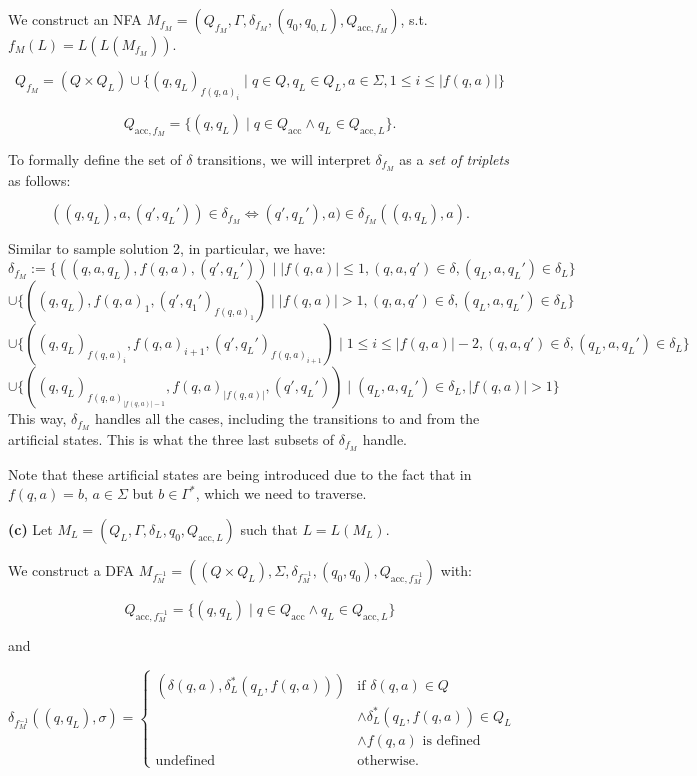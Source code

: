 We construct an NFA $M_{f_M} = (Q_{f_M}, \Gamma, \delta_{f_M}, (q_0, q_{0, L}), Q_{\text{acc},f_M})$, s.t. $f_M(L) = L(L(M_{f_M}))$.

\[
Q_{f_M} = (Q \times Q_L) \cup \{(q, q_L)_{f(q,a)_i} \mid q \in Q, q_L \in Q_L, a \in \Sigma, 1 \leq i \leq |f(q, a)|\}
\]

\[
Q_{\text{acc},f_M} = \{(q, q_L) \mid q \in Q_{\text{acc}} \land q_L \in Q_{\text{acc},L}\}.
\]

To formally define the set of $\delta$ transitions, we will interpret $\delta_{f_M}$ as a \emph{set of triplets} as follows:

\[
((q, q_L), a, (q', q_L')) \in \delta_{f_M} \iff (q', q_L'), a) \in \delta_{f_M}((q, q_L), a).
\]

Similar to sample solution 2, in particular, we have:
\[
\delta_{f_M} :=
\{((q, a, q_L), f(q, a), (q', q_L')) \mid |f(q, a)| \leq 1, (q, a, q') \in \delta, (q_L, a, q_L') \in \delta_L\}
\]
\[
\cup \{((q, q_L), f(q, a)_1, (q', q_1')_{f(q, a)_1}) \mid |f(q, a)| > 1, (q, a, q') \in \delta, (q_L, a, q_L') \in \delta_L\}
\]
\[
\cup \{((q, q_L)_{f(q, a)_i}, f(q, a)_{i+1}, (q', q_L')_{f(q, a)_{i+1}}) \mid 1 \leq i \leq |f(q, a)| - 2, (q, a, q') \in \delta, (q_L, a, q_L') \in \delta_L\}
\]
\[
\cup \{((q, q_L)_{f(q, a)_{|f(q, a)|-1}}, f(q, a)_{|f(q, a)|}, (q', q_L')) \mid  (q_L, a, q_L') \in \delta_L, |f(q, a)| > 1\}
\]
This way, $\delta_{f_M}$ handles all the cases, including the transitions to and from the artificial states. This is what the three last subsets of $\delta_{f_M}$ handle.

Note that these artificial states are being introduced due to the fact that in $f(q, a) = b$, $a \in \Sigma$ but $b \in \Gamma^*$, which we need to traverse.

\noindent
\textbf{(c)}
Let $M_L = (Q_L, \Gamma, \delta_L, q_0, Q_{\text{acc},L})$ such that $L = L(M_L)$.

We construct a DFA $M_{f_M^{-1}} = ((Q \times Q_L), \Sigma, \delta_{f_M^{-1}}, (q_0, q_0), Q_{\text{acc},f_M^{-1}})$ with:

\[
Q_{\text{acc},f_M^{-1}} = \{(q, q_L) \mid q \in Q_{\text{acc}} \land q_L \in Q_{\text{acc},L} \}
\]

and

\[
\delta_{f_M^{-1}}((q, q_L), \sigma) =
\begin{cases} 
  (\delta(q, a), \delta_L^*(q_L, f(q, a))) & \text{if } \delta(q, a) \in Q \\
  & \land \delta_L^*(q_L, f(q, a)) \in Q_L \\
  & \land f(q, a) \text{ is defined} \\
  \text{undefined} & \text{otherwise.}
\end{cases}
\]

